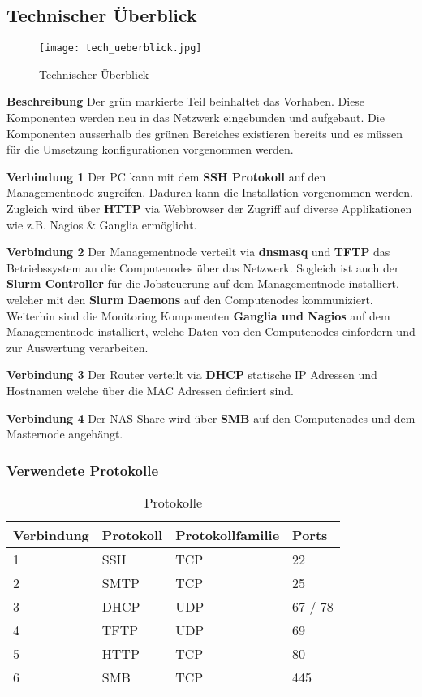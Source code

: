 \subsection{Technischer Überblick}
\begin{figure}[H]
\centering
\texttt{[image: tech\_ueberblick.jpg]}
\caption{Technischer Überblick}
\label{fig:Technischer Überblick}
\end{figure} 

\textbf{Beschreibung}\newline
Der grün markierte Teil beinhaltet das Vorhaben. Diese Komponenten werden neu in das Netzwerk eingebunden und aufgebaut. Die Komponenten ausserhalb des grünen Bereiches existieren bereits und es müssen für die Umsetzung konfigurationen vorgenommen werden.

\textbf{Verbindung 1} \newline
Der PC kann mit dem \textbf{SSH Protokoll} auf den Managementnode zugreifen. Dadurch kann die Installation vorgenommen werden. Zugleich wird über \textbf{HTTP} via Webbrowser der Zugriff auf diverse Applikationen wie z.B. Nagios \& Ganglia ermöglicht.

\textbf{Verbindung 2} \newline
Der Managementnode verteilt via \textbf{dnsmasq} und  \textbf {TFTP} das Betriebssystem an die Computenodes über das Netzwerk. Sogleich ist auch der \textbf{Slurm Controller} für die Jobsteuerung auf dem Managementnode installiert, welcher mit den \textbf{Slurm Daemons} auf den Computenodes kommuniziert. Weiterhin sind die Monitoring Komponenten \textbf{Ganglia und Nagios} auf dem Managementnode installiert, welche Daten von den Computenodes einfordern und zur Auswertung verarbeiten.

\textbf{Verbindung 3} \newline
Der Router verteilt via \textbf{DHCP} statische IP Adressen und Hostnamen welche über die MAC Adressen definiert sind.

\textbf{Verbindung 4} \newline
Der NAS Share wird über \textbf{SMB} auf den Computenodes und dem Masternode angehängt.

\subsubsection{Verwendete Protokolle}
\begin{table}[H]
\centering
\begin{tabular}{p{2cm}p{4cm}p{5cm}p{5cm}}
\hline
\rowcolor{heading} \textbf{Verbindung} & \textbf{Protokoll} & \textbf{Protokollfamilie} & \textbf{Ports} \\\hline
1 & SSH & TCP & 22 \\\hline
2 & SMTP & TCP & 25 \\\hline
3 & DHCP & UDP & 67 / 78 \\\hline
4 & TFTP & UDP & 69 \\\hline
5 & HTTP & TCP & 80 \\\hline
6 & SMB & TCP & 445 \\\hline
\end{tabular}
\caption{Protokolle}
\end{table}
